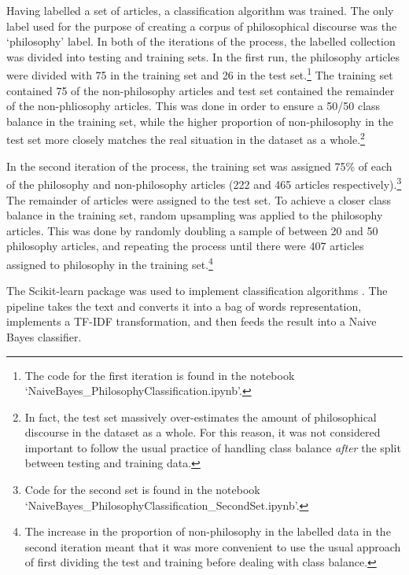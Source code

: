 \documentclass{article}
\begin{document}
Having labelled a set of articles, a classification algorithm was trained. The only label used for the purpose of creating a corpus of philosophical discourse was the `philosophy' label. In both of the iterations of the process, the labelled collection was divided into testing and training sets. In the first run, the philosophy articles were divided with 75 in the training set and 26 in the test set.\footnote{The code for the first iteration is found in the notebook `NaiveBayes\_\-PhilosophyClassification.ipynb'.}
The training set contained 75 of the non-philosophy articles and test set contained the remainder of the non-phliosophy articles. This was done in order to ensure a 50/50 class balance in the training set, while the higher proportion of non-philosophy in the test set more closely matches the real situation in the dataset as a whole.\footnote{In fact, the test set massively over-estimates the amount of philosophical discourse in the dataset as a whole. For this reason, it was not considered important to follow the usual practice of handling class balance \emph{after} the split between testing and training data.}

In the second iteration of the process, the training set was assigned 75\% of each of the philosophy and non-philosophy articles (222 and 465 articles respectively).\footnote{Code for the second set is found in the notebook `NaiveBayes\_\-PhilosophyClassification\_\-SecondSet.ipynb'.} The remainder of articles were assigned to the test set. To achieve a closer class balance in the training set, random upsampling was applied to the philosophy articles. This was done by randomly doubling a sample of between 20 and 50 philosophy articles, and repeating the process until there were 407 articles assigned to philosophy in the training set.\footnote{The increase in the proportion of non-philosophy in the labelled data in the second iteration meant that it was more convenient to use the usual approach of first dividing the test and training before dealing with class balance.}

The Scikit-learn package was used to implement classification algorithms \cite{scikit-learn}. The pipeline takes the text and converts it into a bag of words representation, implements a TF-IDF transformation, and then feeds the result into a Naive Bayes classifier.
\end{document}
